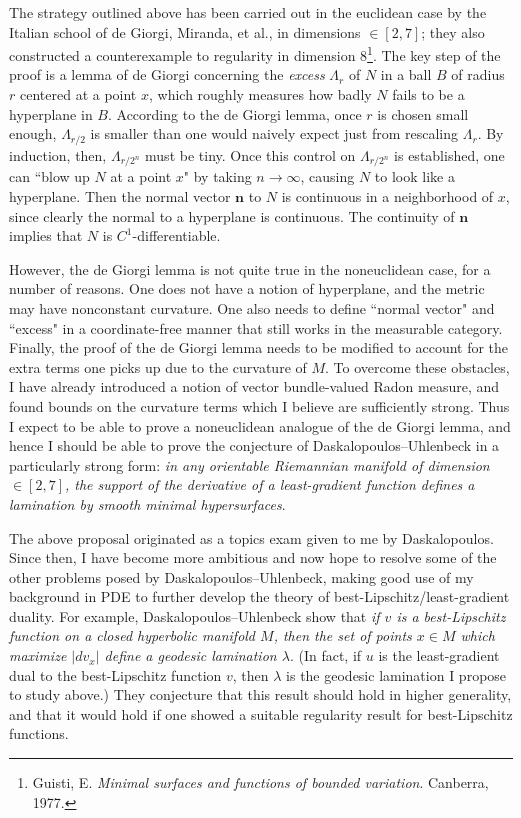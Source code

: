 \documentclass[12pt]{article}
\begin{document}
The strategy outlined above has been carried out in the euclidean case by the Italian school of de Giorgi, Miranda, et al., in dimensions $\in [2, 7]$; they also constructed a counterexample to regularity in dimension $8$\footnote{Guisti, E. \emph{Minimal surfaces and functions of bounded variation}. Canberra, 1977.}.
The key step of the proof is a lemma of de Giorgi concerning the \emph{excess} $\Lambda_r$ of $N$ in a ball $B$ of radius $r$ centered at a point $x$, which roughly measures how badly $N$ fails to be a hyperplane in $B$.
According to the de Giorgi lemma, once $r$ is chosen small enough, $\Lambda_{r/2}$ is smaller than one would naively expect just from rescaling $\Lambda_r$.
By induction, then, $\Lambda_{r/2^n}$ must be tiny.
Once this control on $\Lambda_{r/2^n}$ is established, one can ``blow up $N$ at a point $x$" by taking $n \to \infty$, causing $N$ to look like a hyperplane.
Then the normal vector $\mathbf n$ to $N$ is continuous in a neighborhood of $x$, since clearly the normal to a hyperplane is continuous.
The continuity of $\mathbf n$ implies that $N$ is $C^1$-differentiable.

However, the de Giorgi lemma is not quite true in the noneuclidean case, for a number of reasons.
One does not have a notion of hyperplane, and the metric may have nonconstant curvature.
One also needs to define ``normal vector" and ``excess" in a coordinate-free manner that still works in the measurable category.
Finally, the proof of the de Giorgi lemma needs to be modified to account for the extra terms one picks up due to the curvature of $M$.
To overcome these obstacles, I have already introduced a notion of vector bundle-valued Radon measure, and found bounds on the curvature terms which I believe are sufficiently strong.
Thus I expect to be able to prove a noneuclidean analogue of the de Giorgi lemma, and hence I should be able to prove the conjecture of Daskalopoulos--Uhlenbeck in a particularly strong form: \emph{in any orientable Riemannian manifold of dimension $\in [2, 7]$, the support of the derivative of a least-gradient function defines a lamination by smooth minimal hypersurfaces}.

The above proposal originated as a topics exam given to me by Daskalopoulos.
Since then, I have become more ambitious and now hope to resolve some of the other problems posed by Daskalopoulos--Uhlenbeck, making good use of my background in PDE to further develop the theory of best-Lipschitz/least-gradient duality.
For example, Daskalopoulos--Uhlenbeck show that \emph{if $v$ is a best-Lipschitz function on a closed hyperbolic manifold $M$, then the set of points $x \in M$ which maximize $|dv_x|$ define a geodesic lamination $\lambda$}.
(In fact, if $u$ is the least-gradient dual to the best-Lipschitz function $v$, then $\lambda$ is the geodesic lamination I propose to study above.)
They conjecture that this result should hold in higher generality, and that it would hold if one showed a suitable regularity result for best-Lipschitz functions.
\end{document}
